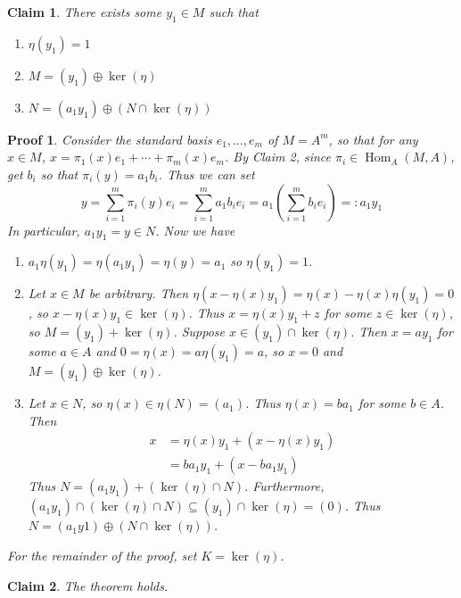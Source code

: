 \documentclass[11pt, a4paper]{memoir}
\theoremstyle{change}
\theoremstyle{plain}
\newtheorem{claim}{Claim}
\theoremstyle{nonumberplain}
\newtheorem{nmproof}{Proof}
\DeclareMathOperator{\Hom}{Hom}
\numberwithin{equation}{section}
\begin{document}
\begin{claim}
    There exists some $y_1\in M$ such that
    \begin{enumerate}[nolistsep,label=(\roman*)]
        \item $\eta(y_1)=1$
        \item $M=(y_1)\oplus\ker(\eta)$
        \item $N=(a_1y_1)\oplus(N\cap\ker(\eta))$
    \end{enumerate}
\end{claim}
\begin{nmproof}
    Consider the standard basis $e_1,\ldots,e_m$ of $M=A^m$, so that for any $x\in M$, $x=\pi_1(x)e_1+\cdots+\pi_m(x)e_m$.
    By Claim 2, since $\pi_i\in\Hom_A(M,A)$, get $b_i$ so that $\pi_i(y)=a_1b_i$.
    Thus we can set
    \begin{equation*}
        y=\sum\limits_{i=1}^m \pi_i(y)e_i=\sum\limits_{i=1}^m a_1b_ie_i=a_1\left(\sum\limits_{i=1}^m b_ie_i\right)=:a_1y_1
    \end{equation*}
    In particular, $a_1y_1=y\in N$.
    Now we have
    \begin{enumerate}[nolistsep,label=(\roman*)]
        \item $a_1\eta(y_1)=\eta(a_1y_1)=\eta(y)=a_1$ so $\eta(y_1)=1$.
        \item Let $x\in M$ be arbitrary.
            Then $\eta(x-\eta(x)y_1)=\eta(x)-\eta(x)\eta(y_1)=0$, so $x-\eta(x)y_1\in\ker(\eta)$.
            Thus $x=\eta(x)y_1+z$ for some $z\in\ker(\eta)$, so $M=(y_1)+\ker(\eta)$.
            Suppose $x\in (y_1)\cap\ker(\eta)$.
            Then $x=ay_1$ for some $a\in A$ and $0=\eta(x)=a\eta(y_1)=a$, so $x=0$ and $M=(y_1)\oplus\ker(\eta)$.
        \item Let $x\in N$, so $\eta(x)\in\eta(N)=(a_1)$.
            Thus $\eta(x)=ba_1$ for some $b\in A$.
            Then
            \begin{align*}
                x &= \eta(x)y_1+(x-\eta(x)y_1)\\
                  &= ba_1y_1+(x-ba_1y_1)
            \end{align*}
            Thus $N=(a_1y_1)+(\ker(\eta)\cap N)$.
            Furthermore, $(a_1y_1)\cap(\ker(\eta)\cap N)\subseteq(y_1)\cap\ker(\eta)=(0)$.
            Thus $N=(a_1y1)\oplus(N\cap\ker(\eta))$.
    \end{enumerate}
    For the remainder of the proof, set $K=\ker(\eta)$.
\end{nmproof}
\begin{claim}
    The theorem holds.
\end{claim}
\end{document}
